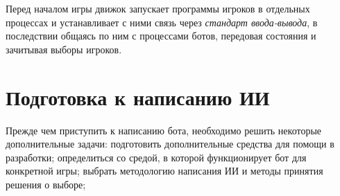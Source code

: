 \documentclass[12pt]{report}
\begin{document}
Перед началом игры движок запускает программы игроков в отдельных процессах и устанавливает с ними связь через \emph{стандарт ввода-вывода}, в последствии общаясь по ним с процессами ботов, передовая состояния и зачитывая выборы игроков.



\section{Подготовка к написанию ИИ}
Прежде чем приступить к написанию бота, необходимо решить некоторые дополнительные задачи: подготовить дополнительные средства для помощи в разработки; определиться со средой, в которой функционирует бот для конкретной игры; выбрать методологию написания ИИ и методы принятия решения о выборе;
\end{document}
